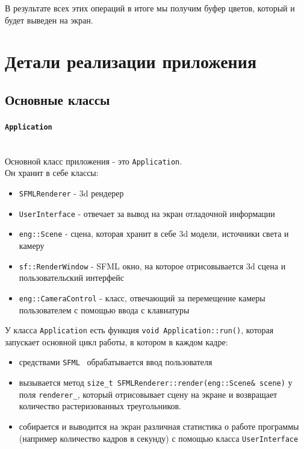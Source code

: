 \documentclass{article}
\begin{document}
В результате всех этих операций в итоге мы получим буфер цветов, который и будет выведен на экран.

\section{Детали реализации приложения}

\subsection{Основные классы}
\paragraph{\texttt{Application}}
$\text{}$\\
Основной класс приложения - это \texttt{Application}. \\
Он хранит в себе классы:
\begin{itemize}
	\item 
	\texttt{SFMLRenderer} - 3d рендерер
	\item \texttt{UserInterface} - отвечает за вывод на экран отладочной информации
	\item \texttt{eng::Scene} - сцена, которая хранит в себе 3d модели, источники света и камеру
	\item \texttt{sf::RenderWindow} - SFML окно, на которое отрисовывается 3d сцена и пользовательский интерфейс
	\item \texttt{eng::CameraControl} - класс, отвечающий за перемещение камеры пользователем с помощью ввода с клавиатуры
\end{itemize} 

У класса \texttt{Application} есть функция \texttt{void Application::run()}, которая запускает основной цикл работы, в котором в каждом кадре:
\begin{itemize}
 \item средствами \texttt{SFML}~\cite{sfml} обрабатывается ввод пользователя
 \item вызывается метод \texttt{size_t SFMLRenderer::render(eng::Scene& scene)} у поля 
 \texttt{renderer_}, который отрисовывает сцену на экране и возвращает количество растеризованных треугольников.
 \item собирается и выводится на экран различная статистика о работе программы (например количество кадров в секунду) с помощью класса \texttt{UserInterface}
\end{itemize}
\end{document}
